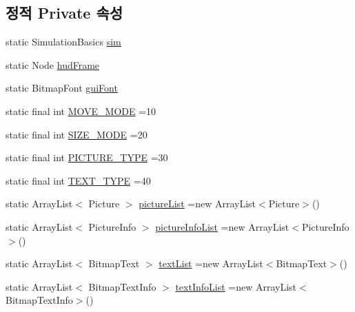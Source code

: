 \subsection*{정적 Private 속성}
\begin{DoxyCompactItemize}
\item 
static Simulation\+Basics \hyperlink{classkr_1_1ac_1_1kookmin_1_1cs_1_1tool_1_1_hud_layout_tool_af06a05d18241dcbe2bc4f2c96d157ee0}{sim}
\item 
static Node \hyperlink{classkr_1_1ac_1_1kookmin_1_1cs_1_1tool_1_1_hud_layout_tool_a1009803f31de3362f409722bb4301dc9}{hud\+Frame}
\item 
static Bitmap\+Font \hyperlink{classkr_1_1ac_1_1kookmin_1_1cs_1_1tool_1_1_hud_layout_tool_a92b0ab831e8b62aaebc0974947958349}{gui\+Font}
\item 
static final int \hyperlink{classkr_1_1ac_1_1kookmin_1_1cs_1_1tool_1_1_hud_layout_tool_aecec03baf905df4aaef15cd37abe3abd}{M\+O\+V\+E\+\_\+\+M\+O\+D\+E} =10
\item 
static final int \hyperlink{classkr_1_1ac_1_1kookmin_1_1cs_1_1tool_1_1_hud_layout_tool_a7072db948603a28712cb20279dc44a3a}{S\+I\+Z\+E\+\_\+\+M\+O\+D\+E} =20
\item 
static final int \hyperlink{classkr_1_1ac_1_1kookmin_1_1cs_1_1tool_1_1_hud_layout_tool_a58687211a1e83d17321e0ee8fc77bd6f}{P\+I\+C\+T\+U\+R\+E\+\_\+\+T\+Y\+P\+E} =30
\item 
static final int \hyperlink{classkr_1_1ac_1_1kookmin_1_1cs_1_1tool_1_1_hud_layout_tool_abbd7ff0bb5a36036d96b889922951fd9}{T\+E\+X\+T\+\_\+\+T\+Y\+P\+E} =40
\item 
static Array\+List$<$ Picture $>$ \hyperlink{classkr_1_1ac_1_1kookmin_1_1cs_1_1tool_1_1_hud_layout_tool_acbd0f26c3534561b74d5f3b75ae4d622}{picture\+List} =new Array\+List$<$Picture$>$()
\item 
static Array\+List$<$ Picture\+Info $>$ \hyperlink{classkr_1_1ac_1_1kookmin_1_1cs_1_1tool_1_1_hud_layout_tool_a8deeda5173478bb396d5eafd48eb5f6f}{picture\+Info\+List} =new Array\+List$<$Picture\+Info$>$()
\item 
static Array\+List$<$ Bitmap\+Text $>$ \hyperlink{classkr_1_1ac_1_1kookmin_1_1cs_1_1tool_1_1_hud_layout_tool_a494376a3549ec46802ef2de1ebf10bc1}{text\+List} =new Array\+List$<$Bitmap\+Text$>$()
\item 
static Array\+List$<$ Bitmap\+Text\+Info $>$ \hyperlink{classkr_1_1ac_1_1kookmin_1_1cs_1_1tool_1_1_hud_layout_tool_a028d96b28a4f07007430d9ac3d29eac9}{text\+Info\+List} =new Array\+List$<$Bitmap\+Text\+Info$>$()

\end{DoxyCompactItemize}
